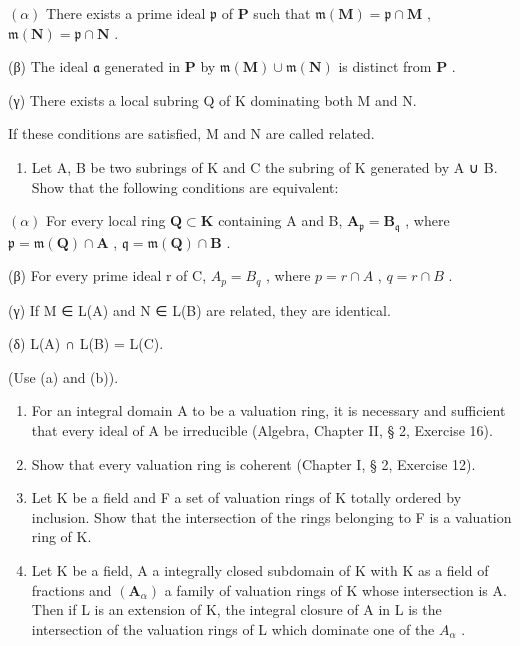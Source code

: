 \((\alpha)\) There exists a prime ideal \(\mathfrak{p}\) of \(\mathbf{P}\) such that \(\mathfrak{m}(\mathbf{M}) = \mathfrak{p} \cap \mathbf{M}\) , \(\mathfrak{m}(\mathbf{N}) = \mathfrak{p} \cap \mathbf{N}\) .

(β) The ideal \(\mathfrak{a}\) generated in \(\mathbf{P}\) by \(\mathfrak{m}(\mathbf{M}) \cup \mathfrak{m}(\mathbf{N})\) is distinct from \(\mathbf{P}\) .

(γ) There exists a local subring Q of K dominating both M and N.

If these conditions are satisfied, M and N are called related.

\begin{enumerate}
\def\labelenumi{(\alph{enumi})}
\setcounter{enumi}{2}
\tightlist
\item
  Let A, B be two subrings of K and C the subring of K generated by A ∪ B. Show that the following conditions are equivalent:
\end{enumerate}

\((\alpha)\) For every local ring \(\mathbf{Q} \subset \mathbf{K}\) containing A and B, \(\mathbf{A}_{\mathfrak{p}} = \mathbf{B}_{\mathfrak{q}}\) , where \(\mathfrak{p} = \mathfrak{m}(\mathbf{Q}) \cap \mathbf{A}\) , \(\mathfrak{q} = \mathfrak{m}(\mathbf{Q}) \cap \mathbf{B}\) .

(β) For every prime ideal r of C, \(A_{p} = B_{q}\) , where \(p = r \cap A\) , \(q = r \cap B\) .

(γ) If M ∈ L(A) and N ∈ L(B) are related, they are identical.

(δ) L(A) ∩ L(B) = L(C).

(Use (a) and (b)).

\begin{enumerate}
\def\labelenumi{\arabic{enumi}.}
\setcounter{enumi}{1}
\item
  For an integral domain A to be a valuation ring, it is necessary and sufficient that every ideal of A be irreducible (Algebra, Chapter II, § 2, Exercise 16).
\item
  Show that every valuation ring is coherent (Chapter I, § 2, Exercise 12).
\item
  Let K be a field and F a set of valuation rings of K totally ordered by inclusion. Show that the intersection of the rings belonging to F is a valuation ring of K.
\item
  Let K be a field, A a integrally closed subdomain of K with K as a field of fractions and \((\mathbf{A}_{\alpha})\) a family of valuation rings of K whose intersection is A. Then if L is an extension of K, the integral closure of A in L is the intersection of the valuation rings of L which dominate one of the \(A_{\alpha}\) .
\end{enumerate}

